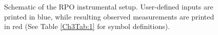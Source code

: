\begin{figure}[t]
	\caption[Schematic of the RPO instrumental setup]{Schematic of the RPO instrumental setup. User-defined inputs are printed in blue, while resulting observed measurements are printed in red (See Table \ref{Ch3Tab:1} for symbol definitions). }
	\label{Ch3Fig:1} 
\end{figure}


